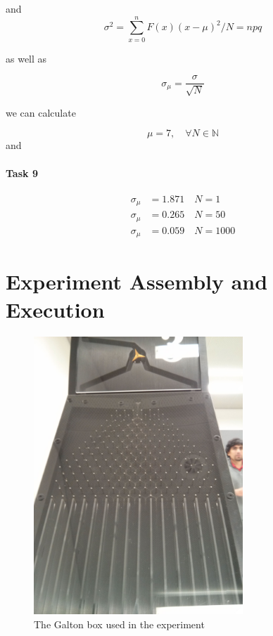 \documentclass{scrreprt}
\begin{document}
and 
\begin{equation}
\sigma^2=\sum_{x=0}^n{F(x)(x-\mu)^2}/N = n p q
\end{equation}

as well as 

\begin{equation}
\sigma_{\mu} = \frac{\sigma}{\sqrt{N}}
\end{equation}

we can calculate 

\[\mu = 7, \quad \forall N \in \mathbb{N}\]
and
\paragraph*{Task 9} 

\begin{align*}
 \sigma_{\mu} &= 1.871 \quad N =1\\
 \sigma_{\mu} &= 0.265 \quad N =50\\ 
 \sigma_{\mu} &= 0.059 \quad N =1000  
\end{align*}

\newpage

\section[The Experiment]{Experiment Assembly and Execution}
\begin{figure}[H]
    \center   
        \includegraphics[width=0.7\textwidth]{img/Galton.png}
        \caption{The Galton box used in the experiment}
\end{figure}
\end{document}
